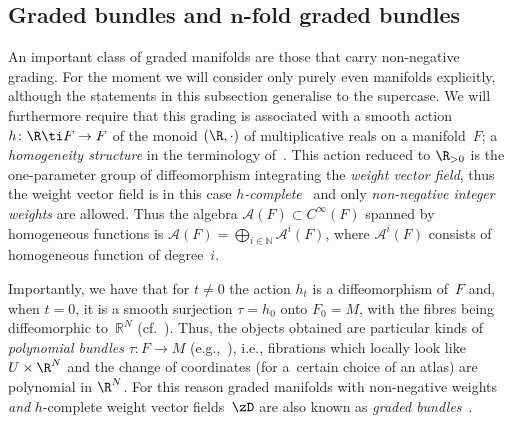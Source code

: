\subsection[Graded bundles and $n$-fold graded bundles]{Graded bundles and $\boldsymbol{n}$-fold graded bundles}

An important class of graded manifolds are those that carry non-negative grading. For the moment we will consider only purely even manifolds explicitly, although the statements in this subsection generalise to the supercase. We will furthermore require that this grading is associated with a smooth action $h\colon \R\ti F\to F$ of the monoid $(\R,\cdot)$ of multiplicative reals on a mani\-fold~$F$; a \emph{homogeneity structure} in the terminology of~\cite{JG_MR_higher_vb}. This action reduced to $\R_{>0}$ is the one-parameter group of dif\/feomorphism integrating the \emph{weight vector field}, thus the weight vector f\/ield is in this case \emph{$h$-complete}~\cite{Grabowski2013} and only \emph{non-negative integer weights} are allowed. Thus the algebra $\mathcal{A}(F)\subset C^\infty(F)$ spanned by homogeneous functions is $\mathcal{A}(F) = \bigoplus_{i \in \mathbb{N}}\mathcal{A}^{i}(F)$, where $\mathcal{A}^{i}(F)$ consists of homogeneous function of degree~$i$.

Importantly, we have that for $t \neq 0$ the action $h_{t}$ is a dif\/feomorphism of~$F$ and, when $t=0$, it is a smooth surjection $\tau=h_0$ onto $F_{0}=M$, with the f\/ibres being dif\/feomorphic to~$\mathbb{R}^{N}$ (cf.~\cite{JG_MR_higher_vb}). Thus, the objects obtained are particular kinds of \emph{polynomial bundles} $\tau\colon F\to M$ (e.g.,~\cite{Bertram:2014, Voronov:2010_highr_alg}), i.e., f\/ibrations which locally look like $U\times\R^N$ and the change of coordinates (for a~certain choice of an atlas) are polynomial in $\R^N$. For this reason graded manifolds with non-negative weights \emph{and} $h$-complete weight vector f\/ields~$\zD$ are also known as \emph{graded bundles}~\cite{JG_MR_higher_vb}.

